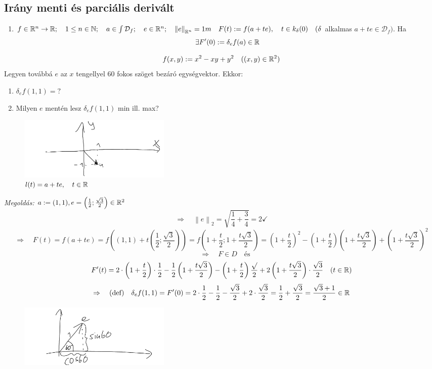 \documentclass[a4paper,11.5pt]{article}
\newcommand{\norm}[1]{\left\lVert#1\right\rVert}
\begin{document}
	\subsection{Irány menti és parciális derivált}
	\begin{revision}
		\begin{enumerate} 
			\item $f\in\R{^n}\to\R;\quad 1\leq n\in\N;\quad a\in\int\mathcal{D}_f;\quad e\in\R^n;\quad \norm{e}_{\R^n}=1 m\quad F(t):=f(a+te),\quad t\in k_\delta(0)\quad (\delta$ alkalmas $a+te\in\mathcal{D}_f).$ Ha
			\[ \exists F'(0):=\delta_ef(a)\in\mathbb{R} \]
		\end{enumerate}
	\end{revision}
	\begin{task}
		\[ f(x,y):=x^2-xy+y^2\quad ((x,y)\in\mathbb{R}^2) \]
		Legyen továbbá $e$ az $x$ tengellyel 60 fokos szöget bezáró egységvektor.
		Ekkor:
		\begin{enumerate}
			\item $\delta_{e}f(1,1)=?$
			\item Milyen $e$ mentén lesz $\delta_{e}f(1,1)$ min ill. max?
		\end{enumerate}
		\begin{figure}[H]
			\centering
			\includegraphics[height=3cm]{kepek/07.png}
			\caption{$l(t)=a+te,\quad  t\in\mathbb{R}$}
		\end{figure}
		\textit{Megoldás:} $a:=(1,1), e=\left(\frac{1}{2};\frac{\sqrt{3}}{2}\right)\in\mathbb{R}^2$
		\[ \Rightarrow\quad \norm{e}_2=\sqrt{\frac{1}{4}+\frac{3}{4}}=2\checkmark \]
		\[ \Rightarrow \quad F(t)=f(a+te)=f((1,1)+t\left(\frac{1}{2};\frac{\sqrt{3}}{2}\right))=f\left(1+\frac{t}{2};1+\frac{t\sqrt{3}}{2}\right)=\left(1+\frac{t}{2}\right)^2-\left(1+\frac{t}{2}\right)\left(1+\frac{t\sqrt{3}}{2}\right)+\left(1+\frac{t\sqrt{3}}{2}\right)^2\]
		\[\quad \Rightarrow\quad F\in D\quad \text{és} \]
		\[ F'(t)=2\cdot\left(1+\frac{t}{2}\right)\cdot\frac{1}{2}-\frac{1}{2}\left(1+\frac{t\sqrt{3}}{2}\right)-\left(1+\frac{t}{2}\right)\frac{\sqrt{}}{2}+2\left(1+\frac{t\sqrt{3}}{2}\right)\cdot\frac{\sqrt{3}}{2}\quad (t\in\mathbb{R}) \]
		\[\Rightarrow\quad \text{(def)}\quad \delta_ef(1,1)=F'(0)=2\cdot\frac{1}{2}-\frac{1}{2}-\frac{\sqrt{3}}{2}+2\cdot\frac{\sqrt{3}}{2}=\frac{1}{2}+\frac{\sqrt{3}}{2}=\frac{\sqrt{3}+1}{2}\in\mathbb{R} \]
		\begin{figure}[H]
			\centering
			\includegraphics[height=3cm]{kepek/02.png}
			\caption{}
		\end{figure}
		
	\end{task}
\end{document}
